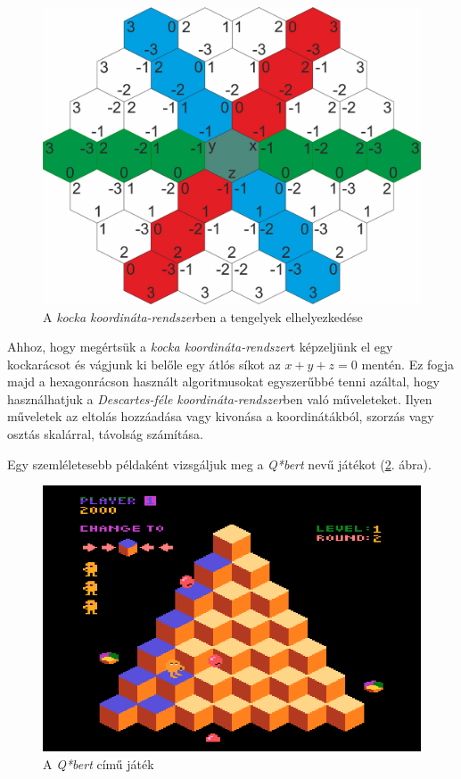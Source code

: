 \begin{figure}[h!]
\centering
\includegraphics[scale=0.4]{kepek/CubeCoord.jpg}
\caption{A \textit{kocka koordináta-rendszer}ben a tengelyek elhelyezkedése}
\label{fig:CubeCoord}
\end{figure}

Ahhoz, hogy megértsük a \textit{kocka koordináta-rendszer}t képzeljünk el egy kockarácsot és vágjunk ki belőle egy átlós síkot az $x + y + z = 0$ mentén. Ez fogja majd a hexagonrácson használt algoritmusokat egyszerűbbé tenni azáltal, hogy használhatjuk a \textit{Descartes-féle koordináta-rendszer}ben való műveleteket. Ilyen műveletek az eltolás hozzáadása vagy kivonása a  koordinátákból, szorzás vagy osztás skalárral, távolság számítása.

Egy szemléletesebb példaként vizsgáljuk meg a \textit{Q*bert} nevű játékot (\ref{fig:Qbert}. ábra).

\begin{figure}[h!]
\centering
\includegraphics[scale=0.5]{kepek/Qbert.png}
\caption{A \textit{Q*bert} című játék}
\label{fig:Qbert}
\end{figure}

